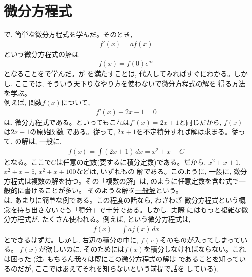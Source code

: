 \section{微分方程式}\label{sect_diffeq0}

で, 簡単な微分方程式を学んだ。そのとき, 
\begin{eqnarray}
f'(x)=af(x)\label{eq:diffeq0_again}
\end{eqnarray}
という微分方程式の解は
\begin{eqnarray}
f(x)=f(0)e^{ax}\label{eq:diffeq000_IC_again}
\end{eqnarray}
となることをで学んだ。が
を満たすことは, 代入してみればすぐにわかる。しかし, ここでは, 
そういう天下りなやり方を使わないで微分方程式の解を
得る方法を学ぶ。\\

例えば, 関数$f(x)$について, 
\begin{eqnarray}f'(x)-2x-1=0\label{eq:difeqex1}\end{eqnarray}
は, 微分方程式である。といってもこれは$f'(x)=2x+1$と同じだから, $f(x)$は$2x+1$の原始関数
である。従って, $2x+1$を不定積分すれば解は求まる。従って, の解は, 一般に, 
\begin{eqnarray}f(x)=\int (2x+1)\,dx=x^2+x+C\label{eq:difeqex1s2}\end{eqnarray}
となる。ここで$C$は任意の定数(要するに積分定数)である。だから, 
$x^2+x+1$, $x^2+x-5$, $x^2+x+100$などは, いずれもの
解である。このように, 一般に, 微分方程式は複数の解を持つ。その「複数の解」は, 
のように任意定数を含む式で一般的に書けることが多い。
そのような解を\underline{一般解}という。\\

は, あまりに簡単な例である。この程度の話なら, わざわざ
微分方程式という概念を持ち出さないでも「積分」で十分である。しかし, 実際
にはもっと複雑な微分方程式が, たくさん使われる。例えば, 
という微分方程式は, 
\begin{eqnarray}f(x)=\int af(x)\,dx\end{eqnarray}
とできるはずだ。しかし, 右辺の積分の中に, $f(x)$そのものが入ってしまっている。
$f(x)$が欲しいのに, そのためには$f(x)$を積分しなければならない。これは困った
{\small(注: もちろん我々は既にこの微分方程式の解は
であることを知っているのだが, ここではあえてそれを知らないという前提で話を
している)}。\\

